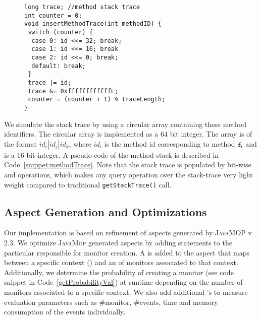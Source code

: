  \begin{figure}[t]
\begin{lstlisting}
long trace; //method stack trace
int counter = 0;
void insertMethodTrace(int methodID) {
 switch (counter) {
  case 0: id <<= 32; break;
  case 1: id <<= 16; break
  case 2: id <<= 0; break;
  default: break;
 }
 trace |= id;
 trace &= 0xffffffffffffL;
 counter = (counter + 1) % traceLength;
}
\end{lstlisting}
\end{figure}

We simulate the stack trace by using a circular array containing these method 
identifiers. The circular array is implemented as a $64$ bit  
integer. The array is of the format $id_i|id_j|id_k$, where $id_i$ is the 
method id corresponding to method $\code{f}_i$ and is a $16$ bit integer. A 
pseudo code of the method stack is described in Code~\ref{snippet:methodTrace}. 
Note that the stack trace is populated by bit-wise \code{<<} and \code{|} 
operations, which makes any query operation over the stack-trace very light 
weight compared to traditional \texttt{getStackTrace()} call.

\subsection{Aspect Generation and Optimizations}
\label{subsec:aspectGen}

Our implementation is based on refinement of aspects generated by 
\textsc{JavaMOP} v$2.3$. 
% 
% 
We optimize \textsc{JavaMop} generated aspects by adding statements to the 
particular  responsible for monitor creation. A  
 is added to the aspect that maps between a specific context () and 
an  of monitors associated to that context. Additionally, we 
 determine the probability of creating a monitor (see code snippet in
 Code~\ref{getProbabilityVal}) at runtime depending on the number of  monitors
 associated to a specific context. %
 We also add additional 's to measure evaluation parameters such 
 as \#monitor, \#events, time and memory consumption of the events individually.

